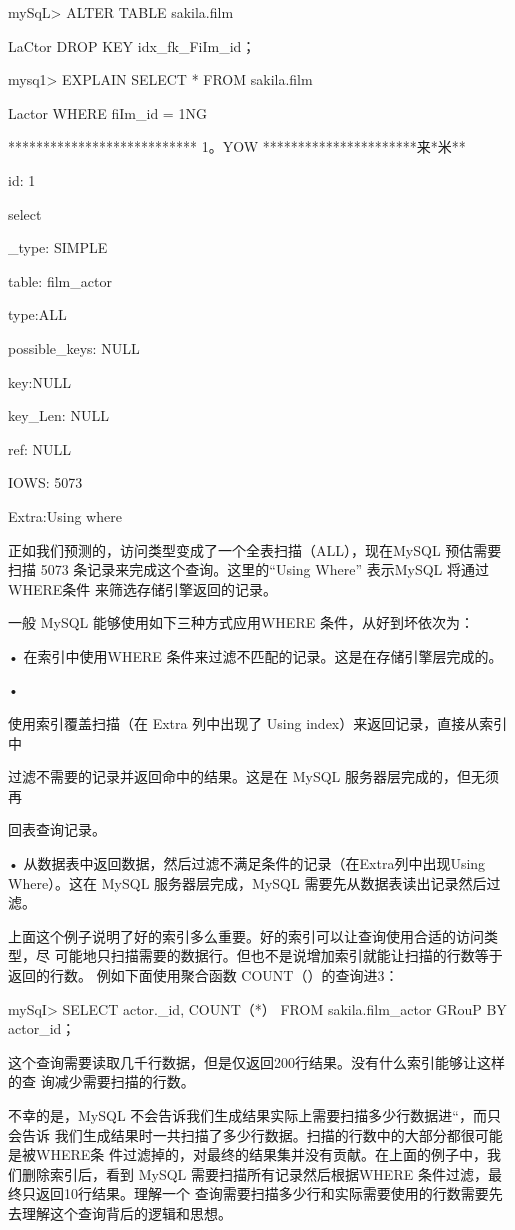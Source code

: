 mySqL> ALTER TABLE sakila.film

LaCtor DROP KEY idx\_fk\_FiIm\_id；

mysq1> EXPLAIN SELECT * FROM sakila.film

Lactor WHERE fiIm\_id = 1NG

*************************** 1。YOW **********************来*米**

id: 1

select

\_type: SIMPLE

table: film\_actor

type:ALL

possible\_keys: NULL

key:NULL

key\_Len: NULL

ref: NULL

IOWS: 5073

Extra:Using where

正如我们预测的，访问类型变成了一个全表扫描（ALL），现在MySQL 预估需要扫描
5073 条记录来完成这个查询。这里的“Using Where” 表示MySQL 将通过 WHERE条件
来筛选存储引擎返回的记录。

一般 MySQL 能够使用如下三种方式应用WHERE 条件，从好到坏依次为：

• 在索引中使用WHERE 条件来过滤不匹配的记录。这是在存储引擎层完成的。

•

使用索引覆盖扫描（在 Extra 列中出现了 Using index）来返回记录，直接从索引中

过滤不需要的记录并返回命中的结果。这是在 MySQL 服务器层完成的，但无须再

回表查询记录。

• 从数据表中返回数据，然后过滤不满足条件的记录（在Extra列中出现Using
Where）。这在 MySQL 服务器层完成，MySQL 需要先从数据表读出记录然后过滤。

上面这个例子说明了好的索引多么重要。好的索引可以让查询使用合适的访问类型，尽
可能地只扫描需要的数据行。但也不是说增加索引就能让扫描的行数等于返回的行数。
例如下面使用聚合函数 COUNT（）的查询进3：

mySqI> SELECT actor.\_id, COUNT（*） FROM sakila.film\_actor GRouP BY actor\_id；

这个查询需要读取几千行数据，但是仅返回200行结果。没有什么索引能够让这样的查
询减少需要扫描的行数。

不幸的是，MySQL 不会告诉我们生成结果实际上需要扫描多少行数据进“，而只会告诉
我们生成结果时一共扫描了多少行数据。扫描的行数中的大部分都很可能是被WHERE条
件过滤掉的，对最终的结果集并没有贡献。在上面的例子中，我们删除索引后，看到
MySQL 需要扫描所有记录然后根据WHERE 条件过滤，最终只返回10行结果。理解一个
查询需要扫描多少行和实际需要使用的行数需要先去理解这个查询背后的逻辑和思想。


